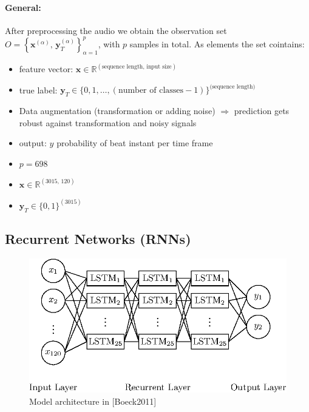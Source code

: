 \documentclass{article}
\begin{document}
\paragraph{General:}

After preprocessing the audio we obtain the observation set $ O = \left\{ \mathbf x^{(\alpha)}, \,\mathbf y_T^{(\alpha)} \right \}_{\alpha = 1}^p$, with $p$ samples in total. As elements the set cointains:
\begin{itemize}
\item feature vector: $\mathbf x \in \mathbb R^{(\text{sequence length}, \,\text{input size})}$
\item true label: $\mathbf y_T \in \{0,1, \dots, (\text{number of classes}-1)\}^{\text{(sequence length)}}$
\end{itemize}

\begin{itemize}
\item Data augmentation (transformation or adding noise) $\Rightarrow$ prediction gets robust against transformation and noisy signals
\item output: $y$ probability of beat instant per time frame 
\end{itemize}


\begin{itemize}
\item $p = 698$
\item $\mathbf x \in \mathbb R^{(3015, \,120)}$
\item $\mathbf y_T \in \{0,1\}^{(3015)}$
\end{itemize}

\subsection{Recurrent Networks (RNNs)}


\begin{figure}[htbp]
\centering
\includegraphics[scale=1.0]{figures/neural_network_boeck.eps}
\caption{Model architecture in \cite{Boeck2011}[Boeck2011]}
\label{fig:}
\end{figure}	
\end{document}
